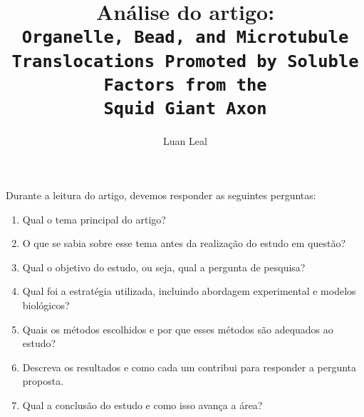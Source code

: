 \documentclass{article}
\author{Luan Leal}
\title{Análise do artigo:\\
    \texttt{Organelle, Bead, and Microtubule Translocations Promoted by Soluble Factors from the\\ Squid Giant Axon}
    }
\begin{document}
\maketitle

Durante a leitura do artigo, devemos responder as seguintes perguntas:
\begin{enumerate}
    \item Qual o tema principal do artigo?
    \item O que se sabia sobre esse tema antes da realização do estudo em questão? 
    \item Qual o objetivo do estudo, ou seja, qual a pergunta de pesquisa? 
    \item Qual foi a estratégia utilizada, incluindo abordagem experimental e modelos  biológicos? 
    \item Quais os métodos escolhidos e por que esses métodos são adequados ao estudo? 
    \item Descreva os resultados e como cada um contribui para responder a pergunta proposta.
    \item Qual a conclusão do estudo e como isso avança a área?  
\end{enumerate}
\end{document}
